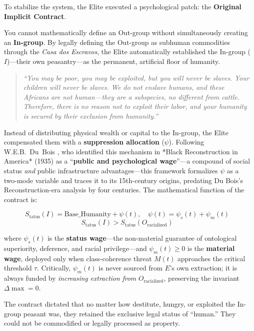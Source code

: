 \documentclass[12pt,openany]{book}
\begin{document}
To stabilize the system, the Elite executed a psychological patch: the \textbf{Original Implicit Contract}.

You cannot mathematically define an Out-group without simultaneously creating an \textbf{In-group}. By legally defining the Out-group as subhuman commodities through the \textit{Casa dos Escravos}, the Elite automatically established the In-group ($I$)---their own peasantry---as the permanent, artificial floor of humanity.

\begin{quote}
\textit{``You may be poor, you may be exploited, but you will never be slaves. Your children will never be slaves. We do not enslave humans, and these Africans are not human---they are a subspecies, no different from cattle. Therefore, there is no reason not to exploit their labor, and your humanity is secured by their exclusion from humanity.''}
\end{quote}

Instead of distributing physical wealth or capital to the In-group, the Elite compensated them with a \textbf{suppression allocation} ($\psi$). Following W.E.B.\ Du~Bois \cite{dubois}, who identified this mechanism in *Black Reconstruction in America* (1935) as a ``\textbf{public and psychological wage}''---a compound of social status \textit{and} public infrastructure advantages---this framework formalizes $\psi$ as a two-mode variable and traces it to its 15th-century origins, predating Du Bois's Reconstruction-era analysis by four centuries. The mathematical function of the contract is:

\[
S_{\text{tatus}}(I) = \text{Base\_Humanity} + \psi(t), \quad \psi(t) = \psi_s(t) + \psi_m(t)
\]
\[
S_{\text{tatus}}(I) > S_{\text{tatus}}(O_{\text{racialized}})
\]

where $\psi_s(t)$ is the \textbf{status wage}---the non-material guarantee of ontological superiority, deference, and racial privilege---and $\psi_m(t) \geq 0$ is the \textbf{material wage}, deployed only when class-coherence threat $M(t)$ approaches the critical threshold $\tau$. Critically, $\psi_m(t)$ is never sourced from $E$'s own extraction; it is always funded by \textit{increasing extraction from $O_{\text{racialized}}$}, preserving the invariant $\Delta\max = 0$.

The contract dictated that no matter how destitute, hungry, or exploited the In-group peasant was, they retained the exclusive legal status of ``human.'' They could not be commodified or legally processed as property.
\end{document}
